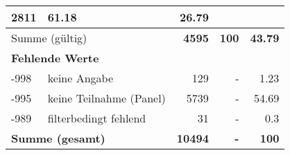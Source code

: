 \begin{longtable}{lXrrr}
       \num{2811} &
       \num[round-mode=places,round-precision=2]{61,18} &
         \num[round-mode=places,round-precision=2]{26,79} \\
     \midrule
     \multicolumn{2}{l}{Summe (gültig)} &
       \textbf{\num{4595}} &
     \textbf{100} &
       \textbf{\num[round-mode=places,round-precision=2]{43,79}} \\
     \multicolumn{5}{l}{\textbf{Fehlende Werte}}\\
       -998 &
       keine Angabe &
         \num{129} &
        - &
         \num[round-mode=places,round-precision=2]{1,23} \\
       -995 &
       keine Teilnahme (Panel) &
         \num{5739} &
        - &
         \num[round-mode=places,round-precision=2]{54,69} \\
       -989 &
       filterbedingt fehlend &
         \num{31} &
        - &
         \num[round-mode=places,round-precision=2]{0,3} \\
     \midrule
     \multicolumn{2}{l}{\textbf{Summe (gesamt)}} &
          \textbf{\num{10494}} &
        \textbf{-} &
        \textbf{100} \\
     \bottomrule
     \end{longtable}
     
